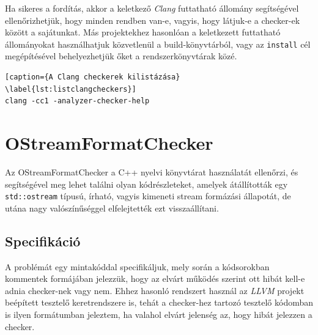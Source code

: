 \documentclass[a4paper,12pt]{report}
\begin{document}
Ha sikeres a fordítás, akkor a keletkező \emph{Clang} futtatható állomány segítségével ellenőrizhetjük, hogy minden rendben van-e, vagyis, hogy látjuk-e a checker-ek között a sajátunkat. Más projektekhez hasonlóan a keletkezett futtatható állományokat használhatjuk közvetlenül a build-könyvtárból, vagy az \texttt{install} cél megépítésével behelyezhetjük őket a rendszerkönyvtárak közé.

\begin{lstlisting}[caption={A Clang checkerek kilistázása}
\label{lst:listclangcheckers}]
clang -cc1 -analyzer-checker-help
\end{lstlisting}

\section{OStreamFormatChecker}
Az OStreamFormatChecker a C++ nyelvi könyvtárat
 használatát ellenőrzi, és segítségével meg lehet találni olyan kódrészleteket, amelyek átállították egy \texttt{std::ostream} típusú, írható, vagyis kimeneti stream formázási állapotát, de utána nagy valószínűséggel elfelejtették ezt visszaállítani.

\subsection{Specifikáció}
A problémát egy mintakóddal specifikáljuk, mely során a kódsorokban kommentek formájában jelezzük, hogy az elvárt működés szerint ott hibát kell-e adnia checker-nek vagy nem. Ehhez hasonló rendszert használ az \emph{LLVM} projekt beépített tesztelő keretrendszere is, tehát a checker-hez tartozó tesztelő kódomban is ilyen formátumban jeleztem, ha valahol elvárt jelenség az, hogy hibát jelezzen a checker.
\end{document}
